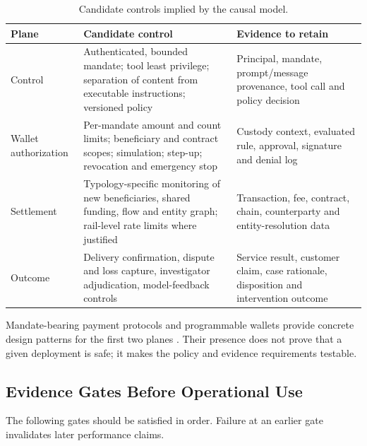 \begin{table}[t]
  \centering
  \caption{Candidate controls implied by the causal model.}
  \label{tab:control_hypotheses}
  \small
  \begin{tabularx}{\textwidth}{@{}p{2.6cm} p{5.0cm} X@{}}
    \toprule
    \textbf{Plane} & \textbf{Candidate control} & \textbf{Evidence to retain} \\
    \midrule
    Control & Authenticated, bounded mandate; tool least privilege; separation
      of content from executable instructions; versioned policy & Principal,
      mandate, prompt/message provenance, tool call and policy decision \\
    Wallet authorization & Per-mandate amount and count limits; beneficiary and
      contract scopes; simulation; step-up; revocation and emergency stop &
      Custody context, evaluated rule, approval, signature and denial log \\
    Settlement & Typology-specific monitoring of new beneficiaries, shared
      funding, flow and entity graph; rail-level rate limits where justified &
      Transaction, fee, contract, chain, counterparty and entity-resolution data \\
    Outcome & Delivery confirmation, dispute and loss capture, investigator
      adjudication, model-feedback controls & Service result, customer claim,
      case rationale, disposition and intervention outcome \\
    \bottomrule
  \end{tabularx}
\end{table}

Mandate-bearing payment protocols and programmable wallets provide concrete
design patterns for the first two planes
\cite{ap2protocol2025,li2026a402,metamask2026agentwallet}.  Their presence does
not prove that a given deployment is safe; it makes the policy and evidence
requirements testable.

\subsection{Evidence Gates Before Operational Use}

The following gates should be satisfied in order.  Failure at an earlier gate
invalidates later performance claims.

